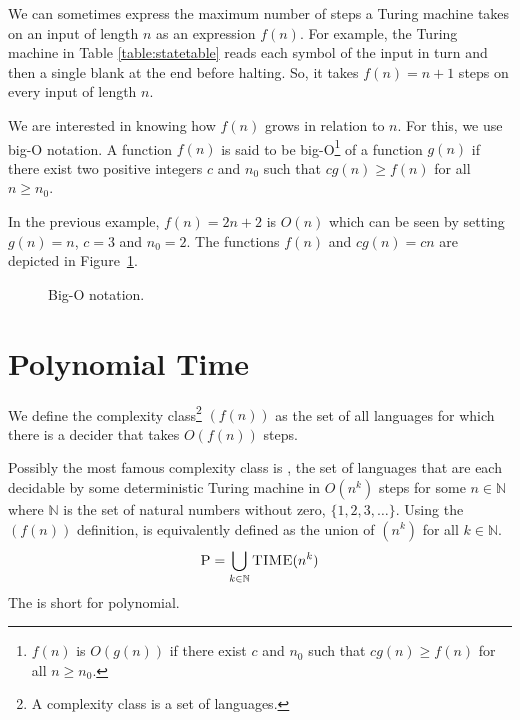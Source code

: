 \documentclass{iansnotes}
\begin{document}
  We can sometimes express the maximum number of steps a Turing machine takes on an input of length $n$ as an expression $f(n)$.
  For example, the Turing machine in Table \ref{table:statetable} reads each symbol of the input in turn and then a single blank at the end before halting.
  So, it takes $f(n) = n + 1$ steps on every input of length $n$.
  
    
  We are interested in knowing how $f(n)$ grows in relation to $n$.
  For this, we use big-O notation.
  A function $f(n)$ is said to be big-O\footnote{$f(n)$ is $O(g(n))$ if there exist $c$ and $n_0$ such that $cg(n) \geq f(n)$ for all $n \geq n_0$.} of a function $g(n)$ if there exist two positive integers $c$ and $n_0$ such that $cg(n) \geq f(n)$ for all \(n \geq n_0 \).

  In the previous example, $f(n) = 2n + 2$ is $O(n)$ which can be seen by setting $g(n) = n$, $c = 3$ and $n_0 = 2$.
  The functions $f(n)$ and $cg(n) = cn$ are depicted in Figure~\ref{figure:bigo}.
  \begin{figure}
  \caption{Big-O notation.}
  \label{figure:bigo}
\end{figure}

\section{Polynomial Time}
  We define the complexity class\footnote{A complexity class is a set of languages.} \((f(n)) \) as the set of all languages for which there is a decider that takes $O\left(f(n)\right)$ steps.
  
  Possibly the most famous complexity class is , the set of languages that are each decidable by some deterministic Turing machine in $O(n^k)$ steps for some $n \in \mathbb{N}$ where $\mathbb{N}$ is the set of natural numbers without zero, $\{ 1, 2, 3, \ldots\}$.
  Using the \((f(n)) \) definition,  is equivalently defined as the union of $(n^k)$ for all $k \in \mathbb{N}$.
  $$ \textsc{P} = \bigcup_{k \in \mathbb{N}} \textsc{TIME}(n^k)$$
  The  is short for polynomial.
  
\end{document}
